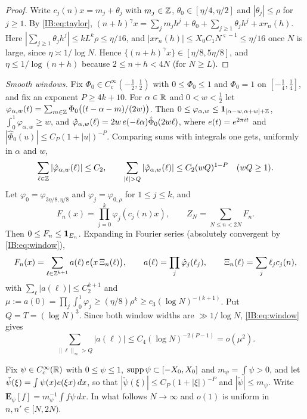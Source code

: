 \begin{proof}
Write $c_j(n)x=m_j+\theta_j$ with $m_j\in\mathbb{Z}$, $\theta_0\in[\eta/4,\eta/2]$ and $|\theta_j|\le\rho$
for $j\ge1$. By \eqref{IB:eq:taylor},
$(n+h)^\gamma x=\sum_jm_jh^j+\theta_0+\sum_{j\ge1}\theta_jh^j+xr_n(h)$. Here
$|\sum_{j\ge1}\theta_jh^j|\le kL^k\rho\le\eta/16$, and $|xr_n(h)|\le X_0C_1N^{\varsigma-1}\le\eta/16$
once $N$ is large, since $\eta\asymp1/\log N$. Hence
$\{(n+h)^\gamma x\}\in[\eta/8,5\eta/8]$, and $\eta\le1/\log(n+h)$ because $2\le n+h<4N$ (for $N\ge L$).
\end{proof}

\emph{Smooth windows.} Fix $\Phi_0\in C_c^\infty(-\frac12,\frac12)$ with
$0\le\Phi_0\le1$ and $\Phi_0=1$ on $[-\frac14,\frac14]$, and fix an exponent
$P\ge 4k+10$. For $\alpha\in\mathbb{R}$ and $0<w<\frac12$ let
$\varphi_{\alpha,w}(t)=\sum_{m\in\mathbb{Z}}\Phi_0\bigl((t-\alpha-m)/(2w)\bigr)$. Then
$0\le\varphi_{\alpha,w}\le\mathbf{1}_{[\alpha-w,\alpha+w]+\mathbb{Z}}$, $\int_0^1\varphi_{\alpha,w}\ge w$, and
$\hat\varphi_{\alpha,w}(\ell)=2w\,e(-\ell\alpha)\hat\Phi_0(2w\ell)$, where
$e(t)=e^{2\pi it}$ and $|\hat\Phi_0(u)|\le C_P(1+|u|)^{-P}$. Comparing sums with
integrals one gets, uniformly in $\alpha$ and $w$,
\begin{equation}\label{IB:eq:window}
\sum_{\ell\in\Z}|\hat\varphi_{\alpha,w}(\ell)|\le C_2,\qquad
\sum_{|\ell|>Q}|\hat\varphi_{\alpha,w}(\ell)|\le C_2(wQ)^{1-P}\quad(wQ\ge1).
\end{equation}
Let $\varphi_0=\varphi_{3\eta/8,\eta/8}$ and $\varphi_j=\varphi_{0,\rho}$ for $1\le j\le k$, and
\[
F_n(x)=\prod_{j=0}^k\varphi_j(c_j(n)x),\qquad Z_N=\sum_{N\le n<2N}F_n .
\]
Then $0\le F_n\le\mathbf{1}_{E_n}$. Expanding in Fourier series (absolutely convergent by
\eqref{IB:eq:window}),
\[
F_n(x)=\sum_{\ell\in\mathbb{Z}^{k+1}}a(\ell)\,e\bigl(x\,\Xi_n(\ell)\bigr),\qquad
a(\ell)=\prod_{j}\hat\varphi_j(\ell_j),\qquad \Xi_n(\ell)=\sum_j\ell_jc_j(n),
\]
with $\sum_\ell|a(\ell)|\le C_2^{k+1}$ and
$\mu:=a(0)=\prod_j\int_0^1\varphi_j\ge(\eta/8)\rho^k\ge c_3(\log N)^{-(k+1)}$.
Put $Q=T=(\log N)^3$. Since both window widths are $\gg1/\log N$,
\eqref{IB:eq:window} gives
\begin{equation}\label{IB:eq:tail}
\sum_{\|\ell\|_\infty>Q}|a(\ell)|\le C_4(\log N)^{-2(P-1)}=o(\mu^2).
\end{equation}

Fix $\psi\in C_c^\infty(\mathbb{R})$ with $0\le\psi\le1$, $\operatorname{supp}\psi\subset[-X_0,X_0]$ and
$m_\psi=\int\psi>0$, and let $\check\psi(\xi)=\int\psi(x)e(\xi x)\,dx$, so that
$|\check\psi(\xi)|\le C_P(1+|\xi|)^{-P}$ and $|\check\psi|\le m_\psi$. Write
$\mathbf E_\psi[f]=m_\psi^{-1}\int f\psi\,dx$. In what follows $N\to\infty$ and $o(1)$ is
uniform in $n,n'\in[N,2N)$.

